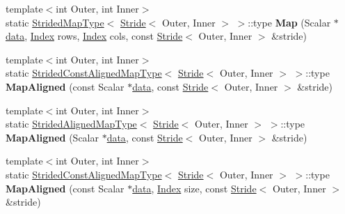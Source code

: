 \begin{Indent}
\begin{DoxyCompactItemize}
{\footnotesize template$<$int Outer, int Inner$>$ }\\static \hyperlink{struct_eigen_1_1_plain_object_base_1_1_strided_map_type}{Strided\+Map\+Type}$<$ \hyperlink{group___core___module_class_eigen_1_1_stride}{Stride}$<$ Outer, Inner $>$ $>$\+::type {\bfseries Map} (Scalar $\ast$\hyperlink{class_eigen_1_1_plain_object_base_ac25699535374b1854cf8494e44ad31b2}{data}, \hyperlink{namespace_eigen_a62e77e0933482dafde8fe197d9a2cfde}{Index} rows, \hyperlink{namespace_eigen_a62e77e0933482dafde8fe197d9a2cfde}{Index} cols, const \hyperlink{group___core___module_class_eigen_1_1_stride}{Stride}$<$ Outer, Inner $>$ \&stride)
\item 
\mbox{\label{class_eigen_1_1_plain_object_base_aadc343ac6294b26d8e2033a1c1400600}} 
{\footnotesize template$<$int Outer, int Inner$>$ }\\static \hyperlink{struct_eigen_1_1_plain_object_base_1_1_strided_const_aligned_map_type}{Strided\+Const\+Aligned\+Map\+Type}$<$ \hyperlink{group___core___module_class_eigen_1_1_stride}{Stride}$<$ Outer, Inner $>$ $>$\+::type {\bfseries Map\+Aligned} (const Scalar $\ast$\hyperlink{class_eigen_1_1_plain_object_base_ac25699535374b1854cf8494e44ad31b2}{data}, const \hyperlink{group___core___module_class_eigen_1_1_stride}{Stride}$<$ Outer, Inner $>$ \&stride)
\item 
\mbox{\label{class_eigen_1_1_plain_object_base_abd8ce90b470cfa30cae08f9c673912c9}} 
{\footnotesize template$<$int Outer, int Inner$>$ }\\static \hyperlink{struct_eigen_1_1_plain_object_base_1_1_strided_aligned_map_type}{Strided\+Aligned\+Map\+Type}$<$ \hyperlink{group___core___module_class_eigen_1_1_stride}{Stride}$<$ Outer, Inner $>$ $>$\+::type {\bfseries Map\+Aligned} (Scalar $\ast$\hyperlink{class_eigen_1_1_plain_object_base_ac25699535374b1854cf8494e44ad31b2}{data}, const \hyperlink{group___core___module_class_eigen_1_1_stride}{Stride}$<$ Outer, Inner $>$ \&stride)
\item 
\mbox{\label{class_eigen_1_1_plain_object_base_a91374e2e77a219a44d980cc14be3a961}} 
{\footnotesize template$<$int Outer, int Inner$>$ }\\static \hyperlink{struct_eigen_1_1_plain_object_base_1_1_strided_const_aligned_map_type}{Strided\+Const\+Aligned\+Map\+Type}$<$ \hyperlink{group___core___module_class_eigen_1_1_stride}{Stride}$<$ Outer, Inner $>$ $>$\+::type {\bfseries Map\+Aligned} (const Scalar $\ast$\hyperlink{class_eigen_1_1_plain_object_base_ac25699535374b1854cf8494e44ad31b2}{data}, \hyperlink{namespace_eigen_a62e77e0933482dafde8fe197d9a2cfde}{Index} size, const \hyperlink{group___core___module_class_eigen_1_1_stride}{Stride}$<$ Outer, Inner $>$ \&stride)

\end{DoxyCompactItemize}
\end{Indent}
